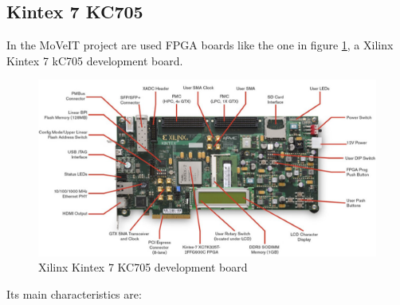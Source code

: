 \subsection{Kintex 7 KC705}
\noindent In the MoVeIT project are used FPGA boards like the one in figure \ref{fig:kintex}, a Xilinx Kintex 7 kC705 development board\cite{kintex7}.
\begin{figure}[H]
	\centering
	\includegraphics[width=0.9\linewidth]{IMG/ch3/KINTEX}
	\caption{Xilinx Kintex 7 KC705 development board}
	\label{fig:kintex}
\end{figure}
\noindent Its main characteristics are:
